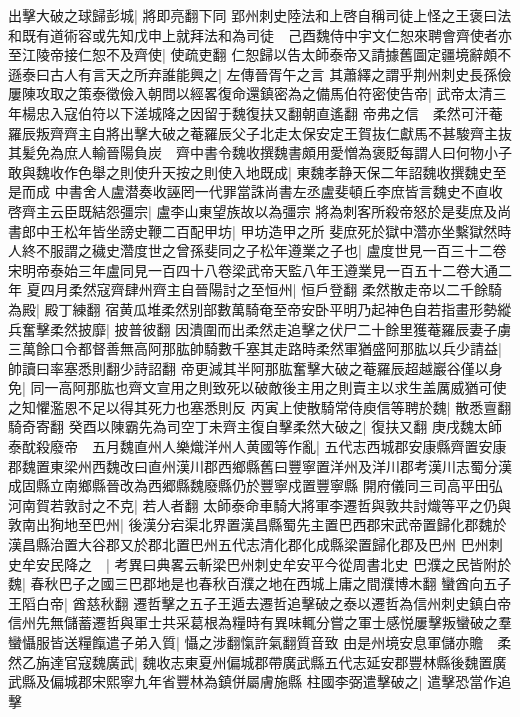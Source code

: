 出擊大破之球歸彭城|{
	將即亮翻下同}
郢州刺史陸法和上啓自稱司徒上怪之王褒曰法和既有道術容或先知戊申上就拜法和為司徒　己酉魏侍中宇文仁恕來聘會齊使者亦至江陵帝接仁恕不及齊使|{
	使疏吏翻}
仁恕歸以告太師泰帝又請據舊圖定疆境辭頗不遜泰曰古人有言天之所弃誰能興之|{
	左傳晉胥午之言}
其蕭繹之謂乎荆州刺史長孫儉屢陳攻取之策泰徵儉入朝問以經畧復命還鎮密為之備馬伯符密使告帝|{
	武帝太清三年楊忠入寇伯符以下溠城降之因留于魏復扶又翻朝直遙翻}
帝弗之信　柔然可汗菴羅辰叛齊齊主自將出擊大破之菴羅辰父子北走太保安定王賀抜仁獻馬不甚駿齊主抜其髪免為庶人輸晉陽負炭　齊中書令魏收撰魏書頗用愛憎為褒貶每謂人曰何物小子敢與魏收作色舉之則使升天按之則使入地既成|{
	東魏孝静天保二年詔魏收撰魏史至是而成}
中書舍人盧潜奏收誣罔一代罪當誅尚書左丞盧斐頓丘李庶皆言魏史不直收啓齊主云臣既結怨彊宗|{
	盧李山東望族故以為彊宗}
將為刺客所殺帝怒於是斐庶及尚書郎中王松年皆坐謗史鞭二百配甲坊|{
	甲坊造甲之所}
斐庶死於獄中濳亦坐繫獄然時人終不服謂之穢史濳度世之曾孫斐同之子松年遵業之子也|{
	盧度世見一百三十二卷宋明帝泰始三年盧同見一百四十八卷梁武帝天監八年王遵業見一百五十二卷大通二年}
夏四月柔然寇齊肆州齊主自晉陽討之至恒州|{
	恒戶登翻}
柔然散走帝以二千餘騎為殿|{
	殿丁練翻}
宿黄瓜堆柔然别部數萬騎奄至帝安卧平明乃起神色自若指畫形勢縱兵奮擊柔然披靡|{
	披普彼翻}
因潰圍而出柔然走追擊之伏尸二十餘里獲菴羅辰妻子虜三萬餘口令都督善無高阿那肱帥騎數千塞其走路時柔然軍猶盛阿那肱以兵少請益|{
	帥讀曰率塞悉則翻少詩詔翻}
帝更減其半阿那肱奮擊大破之菴羅辰超越巖谷僅以身免|{
	同一高阿那肱也齊文宣用之則致死以破敵後主用之則賣主以求生盖厲威猶可使之知懼濫恩不足以得其死力也塞悉則反}
丙寅上使散騎常侍庾信等聘於魏|{
	散悉亶翻騎奇寄翻}
癸酉以陳霸先為司空丁未齊主復自擊柔然大破之|{
	復扶又翻}
庚戌魏太師泰酖殺廢帝　五月魏直州人樂熾洋州人黄國等作亂|{
	五代志西城郡安康縣齊置安康郡魏置東梁州西魏改曰直州漢川郡西鄉縣舊曰豐寧置洋州及洋川郡考漢川志蜀分漢成固縣立南鄉縣晉改為西郷縣魏廢縣仍於豐寧戍置豐寧縣}
開府儀同三司高平田弘河南賀若敦討之不克|{
	若人者翻}
太師泰命車騎大將軍李遷哲與敦共討熾等平之仍與敦南出狥地至巴州|{
	後漢分宕渠北界置漢昌縣蜀先主置巴西郡宋武帝置歸化郡魏於漢昌縣治置大谷郡又於郡北置巴州五代志清化郡化成縣梁置歸化郡及巴州}
巴州刺史牟安民降之　|{
	考異曰典畧云斬梁巴州刺史牟安平今從周書北史}
巴濮之民皆附於魏|{
	春秋巴子之國三巴郡地是也春秋百濮之地在西城上庸之間濮博木翻}
蠻酋向五子王䧟白帝|{
	酋慈秋翻}
遷哲擊之五子王遁去遷哲追擊破之泰以遷哲為信州刺史鎮白帝信州先無儲蓄遷哲與軍士共采葛根為糧時有異味輒分嘗之軍士感悦屢擊叛蠻破之羣蠻懾服皆送糧餼遣子弟入質|{
	懾之涉翻愾許氣翻質音致}
由是州境安息軍儲亦贍　柔然乙旃達官寇魏廣武|{
	魏收志東夏州偏城郡帶廣武縣五代志延安郡豐林縣後魏置廣武縣及偏城郡宋熙寧九年省豐林為鎮併屬膚施縣}
柱國李弼遣擊破之|{
	遣擊恐當作追擊}

